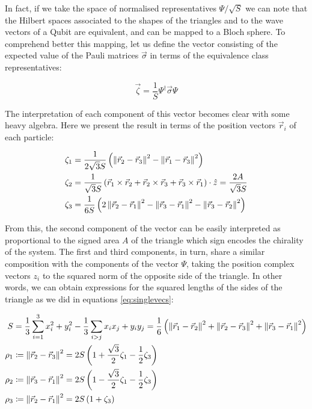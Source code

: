 In fact, if we take the space of normalised representatives $\Psi/\sqrt{S}$ we can note that the Hilbert spaces associated to the shapes of the triangles and to the wave vectors of a Qubit are equivalent, and can be mapped to a Bloch sphere. To comprehend better this mapping, let us define the vector consisting of the expected value of the Pauli matrices $\vec{\sigma}$ in terms of the equivalence class representatives:

\begin{equation}
\vec{\zeta} = \frac{1}{S} \Psi^{\dagger}\vec{\sigma}\Psi
\end{equation}

The interpretation of each component of this vector becomes clear with some heavy algebra. Here we present the result in terms of the position vectors $ \vec{r}_i $ of each particle:

\begin{align*}
\zeta_1 &= \frac{1}{2\sqrt{3}S}\left( \left\lVert \vec{r}_2 -\vec{r}_3 \right\rVert^2-\left\lVert \vec{r}_1 -\vec{r}_3 \right\rVert^2 \right)\\
\zeta_2 &= \frac{1}{\sqrt{3}S}\left( \vec{r}_1\times\vec{r}_2 + \vec{r}_2\times\vec{r}_3 +\vec{r}_3\times\vec{r}_1 \right)\cdot\hat{z} = \frac{2A}{\sqrt{3}S} \\
\zeta_3 &= \frac{1}{6S}\left( 2\left\lVert \vec{r}_2 -\vec{r}_1 \right\rVert^2-\left\lVert \vec{r}_3 -\vec{r}_1 \right\rVert^2-\left\lVert \vec{r}_3 -\vec{r}_2 \right\rVert^2 \right)\\
\end{align*}

From this, the second component of the vector can be easily interpreted as proportional to the signed area $A$ of the triangle which sign encodes the chirality of the system. The first and third components, in turn, share a similar composition with the components of the vector $\Psi$, taking the position complex vectors $z_i$ to the squared norm of the opposite side of the triangle. In other words, we can obtain expressions for the squared lengths of the sides of the triangle as we did in equations \eqref{eq:singlevecs}:

\begin{align*}
S &= \frac{1}{3}\sum_{i=1}^3 x_i^2 + y_i^2 -\frac{1}{3}\sum_{i > j} x_ix_j + y_iy_j  = \frac{1}{6}\left( \left\lVert \vec{r}_1 -\vec{r}_2 \right\rVert^2+\left\lVert \vec{r}_2 -\vec{r}_3 \right\rVert^2+\left\lVert \vec{r}_3 -\vec{r}_1 \right\rVert^2 \right)\\
\rho_1 &\coloneqq \left\lVert \vec{r}_2 -\vec{r}_3 \right\rVert^2 = 2S\left( 1+\frac{\sqrt{3}}{2}\zeta_1-\frac{1}{2}\zeta_3 \right) \\
\rho_2 &\coloneqq \left\lVert \vec{r}_3 -\vec{r}_1 \right\rVert^2 = 2S\left( 1-\frac{\sqrt{3}}{2}\zeta_1-\frac{1}{2}\zeta_3 \right) \\
\rho_3 &\coloneqq \left\lVert \vec{r}_2 -\vec{r}_1 \right\rVert^2 = 2S\left( 1+\zeta_3 \right)
\end{align*}


